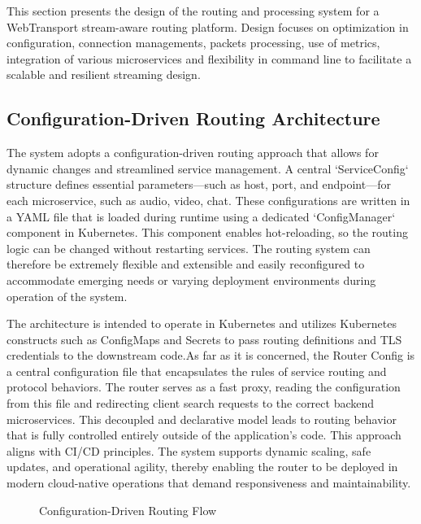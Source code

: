 This section presents the design of the routing and processing system for a WebTransport stream-aware routing platform. Design focuses on optimization in configuration, connection managements, packets processing, use of metrics, integration of various microservices and flexibility in command line to facilitate a scalable and resilient streaming design.

\subsection{Configuration-Driven Routing Architecture}



The system adopts a configuration-driven routing approach that allows for dynamic changes and streamlined service management. A central `ServiceConfig` structure defines essential parameters—such as host, port, and endpoint—for each microservice, such as audio, video, chat. These configurations are written in a YAML file that is loaded during runtime using a dedicated `ConfigManager` component in Kubernetes. This component enables hot-reloading, so the routing logic can be changed without restarting services. The routing system can therefore be extremely flexible and extensible and easily reconfigured to accommodate emerging needs or varying deployment environments during operation of the system.

The architecture is intended to operate in Kubernetes and utilizes Kubernetes constructs such as ConfigMaps and Secrets to pass routing definitions and TLS credentials to the downstream code.As far as it is concerned, the Router Config is a central configuration file that encapsulates the rules of service routing and protocol behaviors. The router serves as a fast proxy, reading the configuration from this file and redirecting client search requests to the correct backend microservices. This decoupled and declarative model leads to routing behavior that is fully controlled entirely outside of the application's code. This approach aligns with CI/CD principles. The system supports dynamic scaling, safe updates, and operational agility, thereby enabling the router to be deployed in modern cloud-native operations that demand responsiveness and maintainability.


\begin{figure}[h]
\centering
{}
\caption{Configuration-Driven Routing Flow}
\label{fig:config_routing}
\end{figure}

